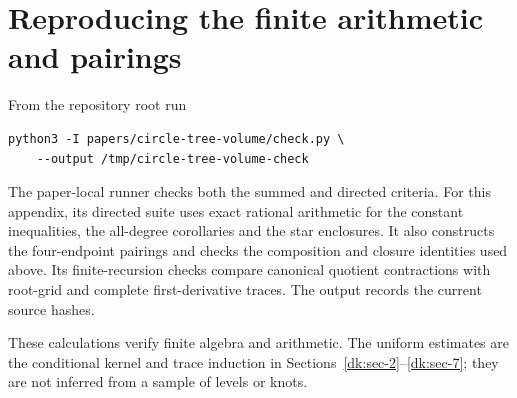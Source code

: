 \section{Reproducing the finite arithmetic and pairings}\label{dk:sec-10}

From the repository root run
\begin{verbatim}
python3 -I papers/circle-tree-volume/check.py \
    --output /tmp/circle-tree-volume-check
\end{verbatim}
The paper-local runner checks both the summed and directed criteria.
For this appendix, its directed suite uses exact rational arithmetic
for the constant inequalities, the all-degree corollaries and the star
enclosures. It also constructs the four-endpoint pairings and checks
the composition and closure identities used above. Its finite-recursion
checks compare canonical quotient contractions with root-grid and
complete first-derivative traces. The output records the current
source hashes.

These calculations verify finite algebra and arithmetic. The uniform
estimates are the conditional kernel and trace induction in
Sections~\ref{dk:sec-2}--\ref{dk:sec-7}; they are not inferred
from a sample of levels or knots.
